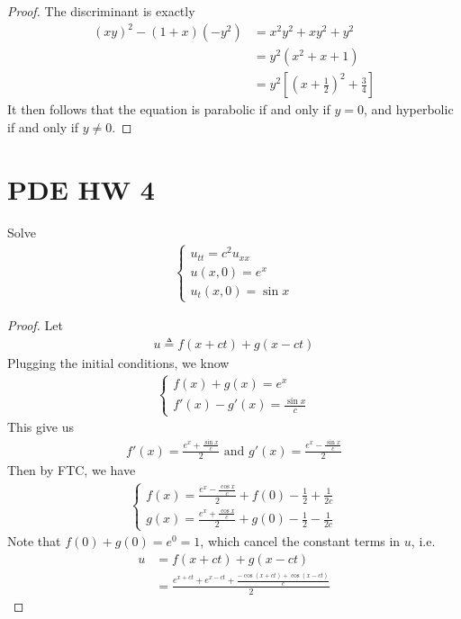 \documentclass{report}
\begin{document}
\begin{proof}
The discriminant is exactly 
\begin{align*}
  (xy)^2- (1+x)(-y^2)&=x^2y^2+xy^2+y^2\\
  &=y^2 (x^2+x+1)\\
  &=y^2[(x+\frac{1}{2})^2+ \frac{3}{4}]
\end{align*}
It then follows that the equation is parabolic if and only if $y=0$, and hyperbolic if and only if  $y\neq 0$. 

\end{proof}
\section{PDE HW 4}
\begin{question}{}{}
Solve 
\begin{align*}
\begin{cases}
  u_{tt}=c^2u_{xx} \\
  u(x,0)=e^x \\
  u_t(x,0)= \sin x 
\end{cases}
\end{align*}
\end{question}
\begin{proof}
Let 
\begin{align*}
u\triangleq f(x+ct)+g(x-ct)
\end{align*}
Plugging the initial conditions, we know 
\begin{align*}
\begin{cases}
 f(x)+g(x)=e^x \\
 f'(x)-g'(x)= \frac{\sin x}{c} 
\end{cases}
\end{align*}
This give us 
\begin{align*}
f'(x)= \frac{e^x+ \frac{\sin x}{c}}{2}\text{ and }g'(x)= \frac{e^x - \frac{\sin x}{c}}{2}
\end{align*}
Then by FTC, we have
\begin{align*}
\begin{cases}
  f(x)= \frac{e^x-\frac{\cos x}{c}}{2}+f(0)- \frac{1}{2} +\frac{1}{2c} \\
  g(x)= \frac{e^x + \frac{\cos x}{c}}{2} +g(0) - \frac{1}{2}- \frac{1}{2c}
\end{cases}
\end{align*}
Note that $f(0)+g(0)=e^0=1$, which cancel the constant terms in $u$, i.e.
\begin{align*}
u&=f(x+ct)+g(x-ct)\\
&=\frac{e^{x+ct}+ e^{x-ct} + \frac{-\cos (x+ct)+ \cos (x-ct)}{c}}{2}
\end{align*}
\end{proof}
\end{document}
